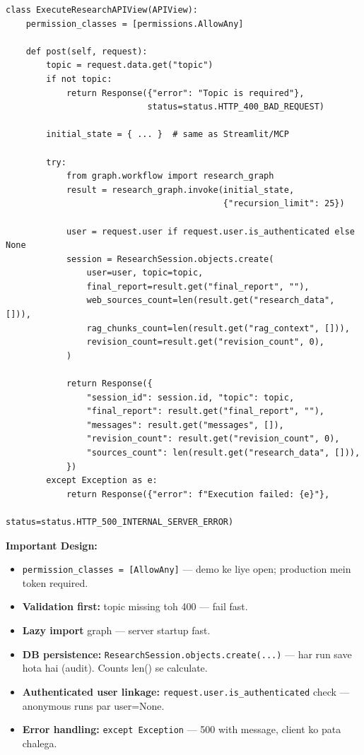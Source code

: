 \documentclass[11pt, a4paper]{article}
\begin{document}
\begin{lstlisting}[style=pythonstyle, caption={backend/api/views.py --- ExecuteResearchAPIView}]
class ExecuteResearchAPIView(APIView):
    permission_classes = [permissions.AllowAny]

    def post(self, request):
        topic = request.data.get("topic")
        if not topic:
            return Response({"error": "Topic is required"},
                            status=status.HTTP_400_BAD_REQUEST)

        initial_state = { ... }  # same as Streamlit/MCP

        try:
            from graph.workflow import research_graph
            result = research_graph.invoke(initial_state,
                                           {"recursion_limit": 25})

            user = request.user if request.user.is_authenticated else None
            session = ResearchSession.objects.create(
                user=user, topic=topic,
                final_report=result.get("final_report", ""),
                web_sources_count=len(result.get("research_data", [])),
                rag_chunks_count=len(result.get("rag_context", [])),
                revision_count=result.get("revision_count", 0),
            )

            return Response({
                "session_id": session.id, "topic": topic,
                "final_report": result.get("final_report", ""),
                "messages": result.get("messages", []),
                "revision_count": result.get("revision_count", 0),
                "sources_count": len(result.get("research_data", [])),
            })
        except Exception as e:
            return Response({"error": f"Execution failed: {e}"},
                            status=status.HTTP_500_INTERNAL_SERVER_ERROR)
\end{lstlisting}

\begin{codestorybox}
\textbf{Important Design:}
\begin{itemize}
\item \texttt{permission\_classes = [AllowAny]} --- demo ke liye open; production mein token required.
\item \textbf{Validation first:} topic missing toh 400 --- fail fast.
\item \textbf{Lazy import} graph --- server startup fast.
\item \textbf{DB persistence:} \texttt{ResearchSession.objects.create(...)} --- har run save hota hai (audit). Counts len() se calculate.
\item \textbf{Authenticated user linkage:} \texttt{request.user.is\_authenticated} check --- anonymous runs par user=None.
\item \textbf{Error handling:} \texttt{except Exception} --- 500 with message, client ko pata chalega.
\end{itemize}
\end{codestorybox}
\end{document}
